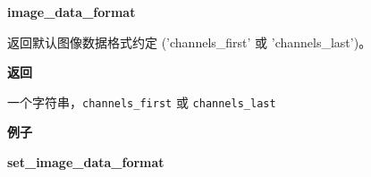 \begin{Shaded}
\begin{Highlighting}[]
\OperatorTok{>>>}    
\OperatorTok{>>>} 
\OperatorTok{>>>} \OperatorTok{=} \NormalTok{numpy.array([}\NormalTok{, }\NormalTok{], dtype}\OperatorTok{=}\NormalTok{)}
\OperatorTok{>>>} 
\NormalTok{)}
\OperatorTok{>>>} \OperatorTok{=} 
\OperatorTok{>>>} 
\NormalTok{array([ }\NormalTok{.], dtype}\OperatorTok{=}
\OperatorTok{>>>} 
\NormalTok{)}
\end{Highlighting}
\end{Shaded}


\textbf{image\_data\_format}\label{imageux5fdataux5fformat}

\begin{Shaded}
\begin{Highlighting}[]
\end{Highlighting}
\end{Shaded}

返回默认图像数据格式约定 ('channels\_first' 或 'channels\_last')。

\textbf{返回}

一个字符串，\texttt{\textquotesingle{}channels\_first\textquotesingle{}}
或 \texttt{\textquotesingle{}channels\_last\textquotesingle{}}

\textbf{例子}

\begin{Shaded}
\begin{Highlighting}[]
\OperatorTok{>>>} 
\end{Highlighting}
\end{Shaded}


\textbf{set\_image\_data\_format}\label{setux5fimageux5fdataux5fformat}

\begin{Shaded}
\begin{Highlighting}[]
\end{Highlighting}
\end{Shaded}

